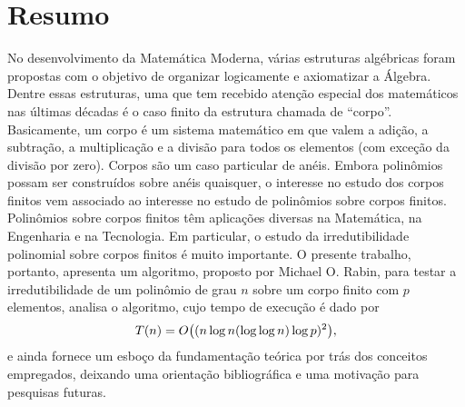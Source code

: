 

\chapter*{Resumo}

No desenvolvimento da Matemática Moderna, várias estruturas algébricas
foram propostas com o objetivo de organizar logicamente e axiomatizar a
Álgebra. Dentre essas estruturas, uma que tem recebido atenção especial
dos matemáticos nas últimas décadas é o caso finito
da estrutura chamada de
``corpo''. Basicamente, um corpo é um sistema matemático em que valem a
adição, a subtração, a multiplicação e a divisão para todos os elementos
(com exceção da divisão por zero). Corpos são um caso particular de
anéis. Embora polinômios possam ser construídos sobre anéis quaisquer, o
interesse no estudo dos corpos finitos vem associado ao interesse no
estudo de polinômios sobre corpos finitos. Polinômios sobre corpos
finitos têm aplicações diversas na Matemática, na Engenharia e na
Tecnologia. Em particular, o estudo da irredutibilidade polinomial sobre
corpos finitos é muito importante. O presente trabalho, portanto,
apresenta um algoritmo, proposto por Michael O. Rabin,
para testar a irredutibilidade de um polinômio de grau $n$ sobre um
corpo finito com $p$ elementos,
 analisa o algoritmo, cujo tempo de execução é
dado por
\begin{equation*}
  T(n) = O\bigl((n\log{n}(\log{\log{n}})\log{p})^2\bigr)\mathrm{,}
\end{equation*}
e ainda fornece um
esboço da fundamentação teórica por trás dos conceitos empregados,
deixando uma orientação bibliográfica e uma motivação para pesquisas
futuras.

